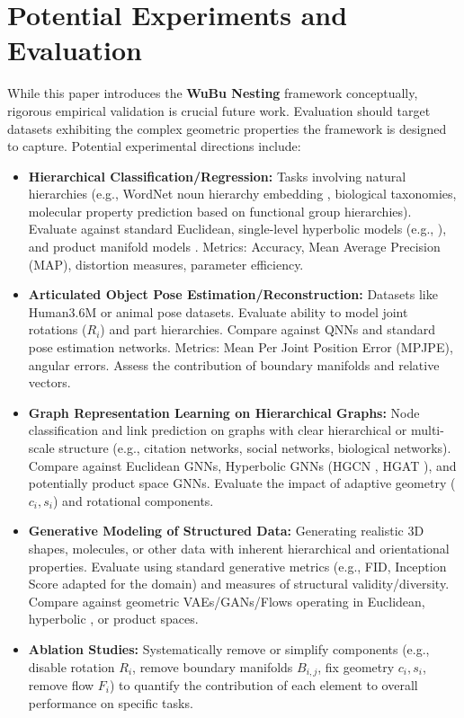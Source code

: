 \documentclass[11pt, twoside]{article} %
\newcommand{\wubu}{\textbf{WuBu Nesting}} %
\begin{document}
\section{Potential Experiments and Evaluation}
\label{sec:experiments}

While this paper introduces the \wubu{} framework conceptually, rigorous empirical validation is crucial future work. Evaluation should target datasets exhibiting the complex geometric properties the framework is designed to capture. Potential experimental directions include:

\begin{itemize}
    \item \textbf{Hierarchical Classification/Regression:} Tasks involving natural hierarchies (e.g., WordNet noun hierarchy embedding \cite{NickelKiela2017}, biological taxonomies, molecular property prediction based on functional group hierarchies). Evaluate against standard Euclidean, single-level hyperbolic models (e.g., \cite{GaneaEtAl2018}), and product manifold models \cite{GuEtAl2019}. Metrics: Accuracy, Mean Average Precision (MAP), distortion measures, parameter efficiency.
    \item \textbf{Articulated Object Pose Estimation/Reconstruction:} Datasets like Human3.6M or animal pose datasets. Evaluate ability to model joint rotations ($R_i$) and part hierarchies. Compare against QNNs \cite{GrassucciEtAl2021} and standard pose estimation networks. Metrics: Mean Per Joint Position Error (MPJPE), angular errors. Assess the contribution of boundary manifolds and relative vectors.
    \item \textbf{Graph Representation Learning on Hierarchical Graphs:} Node classification and link prediction on graphs with clear hierarchical or multi-scale structure (e.g., citation networks, social networks, biological networks). Compare against Euclidean GNNs, Hyperbolic GNNs (HGCN \cite{ChamiEtAl2019}, HGAT \cite{ZhangEtAl2021}), and potentially product space GNNs. Evaluate the impact of adaptive geometry ($c_i, s_i$) and rotational components.
    \item \textbf{Generative Modeling of Structured Data:} Generating realistic 3D shapes, molecules, or other data with inherent hierarchical and orientational properties. Evaluate using standard generative metrics (e.g., FID, Inception Score adapted for the domain) and measures of structural validity/diversity. Compare against geometric VAEs/GANs/Flows operating in Euclidean, hyperbolic \cite{SkopekEtAl2020}, or product spaces.
    \item \textbf{Ablation Studies:} Systematically remove or simplify components (e.g., disable rotation $R_i$, remove boundary manifolds $B_{i,j}$, fix geometry $c_i, s_i$, remove flow $F_i$) to quantify the contribution of each element to overall performance on specific tasks.

\end{itemize}
\end{document}
